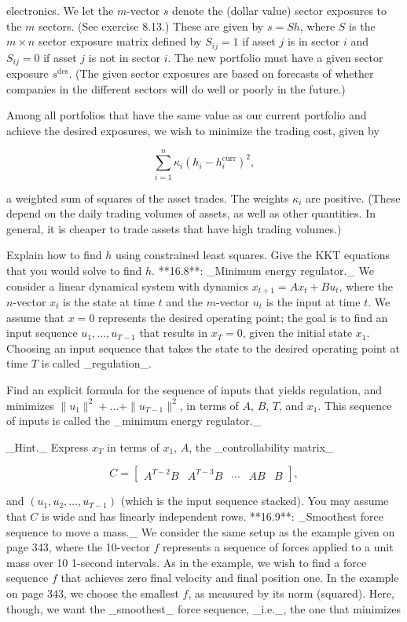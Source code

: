 electronics. We let the \(m\)-vector \(s\) denote the (dollar value) sector exposures to the \(m\) sectors. (See exercise 8.13.) These are given by \(s=Sh\), where \(S\) is the \(m\times n\) sector exposure matrix defined by \(S_{ij}=1\) if asset \(j\) is in sector \(i\) and \(S_{ij}=0\) if asset \(j\) is not in sector \(i\). The new portfolio must have a given sector exposure \(s^{\text{des}}\). (The given sector exposures are based on forecasts of whether companies in the different sectors will do well or poorly in the future.)

Among all portfolios that have the same value as our current portfolio and achieve the desired exposures, we wish to minimize the trading cost, given by

\[\sum_{i=1}^{n}\kappa_{i}(h_{i}-h_{i}^{\text{curr}})^{2},\]

a weighted sum of squares of the asset trades. The weights \(\kappa_{i}\) are positive. (These depend on the daily trading volumes of assets, as well as other quantities. In general, it is cheaper to trade assets that have high trading volumes.)

Explain how to find \(h\) using constrained least squares. Give the KKT equations that you would solve to find \(h\).
**16.8**: _Minimum energy regulator._ We consider a linear dynamical system with dynamics \(x_{t+1}=Ax_{t}+Bu_{t}\), where the \(n\)-vector \(x_{t}\) is the state at time \(t\) and the \(m\)-vector \(u_{t}\) is the input at time \(t\). We assume that \(x=0\) represents the desired operating point; the goal is to find an input sequence \(u_{1},\dots,u_{T-1}\) that results in \(x_{T}=0\), given the initial state \(x_{1}\). Choosing an input sequence that takes the state to the desired operating point at time \(T\) is called _regulation_.

Find an explicit formula for the sequence of inputs that yields regulation, and minimizes \(\|u_{1}\|^{2}+\dots+\|u_{T-1}\|^{2}\), in terms of \(A\), \(B\), \(T\), and \(x_{1}\). This sequence of inputs is called the _minimum energy regulator._

_Hint._ Express \(x_{T}\) in terms of \(x_{1}\), \(A\), the _controllability matrix_

\[C=\left[\begin{array}{cccc}A^{T-2}B&A^{T-3}B&\cdots&AB&B\end{array}\right],\]

and \((u_{1},u_{2},\dots,u_{T-1})\) (which is the input sequence stacked). You may assume that \(C\) is wide and has linearly independent rows.
**16.9**: _Smoothest force sequence to move a mass._ We consider the same setup as the example given on page 343, where the 10-vector \(f\) represents a sequence of forces applied to a unit mass over 10 1-second intervals. As in the example, we wish to find a force sequence \(f\) that achieves zero final velocity and final position one. In the example on page 343, we choose the smallest \(f\), as measured by its norm (squared). Here, though, we want the _smoothest_ force sequence, _i.e._, the one that minimizes

